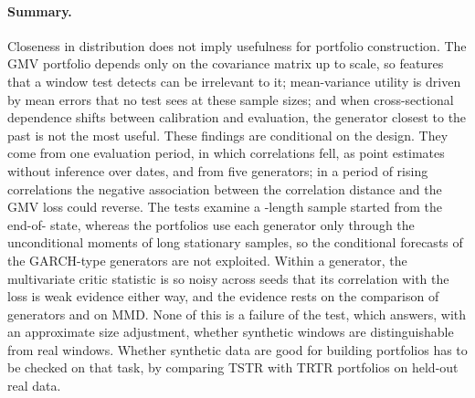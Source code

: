 \paragraph{Summary.}
Closeness in distribution does not imply usefulness for portfolio construction. The GMV portfolio
depends only on the covariance matrix up to scale, so features that a window test detects can be
irrelevant to it; mean-variance utility is driven by mean errors that no test sees at these sample
sizes; and when cross-sectional dependence shifts between calibration and evaluation, the
generator closest to the past is not the most useful. These findings are conditional on the
design. They come from one evaluation period, in which correlations fell, as point estimates
without inference over dates, and from five generators; in a period of rising correlations the
negative association between the correlation distance and the GMV loss could reverse. The tests
examine a \TEST{}-length sample started from the end-of-\TRAIN{} state, whereas the portfolios
use each generator only through the unconditional moments of long stationary samples, so the
conditional forecasts of the GARCH-type generators are not exploited. Within a generator, the multivariate critic statistic is so noisy
across seeds that its correlation with the loss is weak evidence either way, and the evidence
rests on the comparison of generators and on MMD. None of this is a failure of the test, which
answers, with an approximate size adjustment, whether synthetic windows are distinguishable from
real \TEST{} windows. Whether synthetic data are good for building portfolios has to be checked
on that task, by comparing TSTR with TRTR portfolios on held-out real data.
